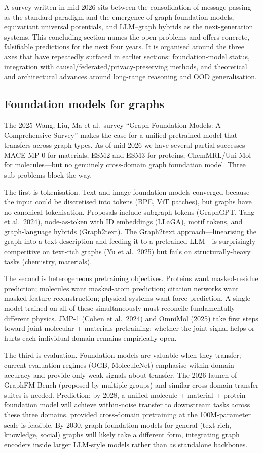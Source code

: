 A survey written in mid-2026 sits between the consolidation of message-passing as the standard paradigm and the emergence of graph foundation models, equivariant universal potentials, and LLM--graph hybrids as the next-generation systems. This concluding section names the open problems and offers concrete, falsifiable predictions for the next four years. It is organised around the three axes that have repeatedly surfaced in earlier sections: foundation-model status, integration with causal/federated/privacy-preserving methods, and theoretical and architectural advances around long-range reasoning and OOD generalisation.

\subsection{Foundation models for graphs}\label{foundation-models-for-graphs}

The 2025 Wang, Liu, Ma et al.~survey ``Graph Foundation Models: A Comprehensive Survey'' makes the case for a unified pretrained model that transfers across graph types. As of mid-2026 we have several partial successes---MACE-MP-0 for materials, ESM2 and ESM3 for proteins, ChemMRL/Uni-Mol for molecules---but no genuinely cross-domain graph foundation model. Three sub-problems block the way.

The first is tokenisation. Text and image foundation models converged because the input could be discretised into tokens (BPE, ViT patches), but graphs have no canonical tokenisation. Proposals include subgraph tokens (GraphGPT, Tang et al.~2024), node-as-token with ID embeddings (LLaGA), motif tokens, and graph-language hybrids (Graph2text). The Graph2text approach---linearising the graph into a text description and feeding it to a pretrained LLM---is surprisingly competitive on text-rich graphs (Yu et al.~2025) but fails on structurally-heavy tasks (chemistry, materials).

The second is heterogeneous pretraining objectives. Proteins want masked-residue prediction; molecules want masked-atom prediction; citation networks want masked-feature reconstruction; physical systems want force prediction. A single model trained on all of these simultaneously must reconcile fundamentally different physics. JMP-1 (Cohen et al.~2024) and OmniMol (2025) take first steps toward joint molecular + materials pretraining; whether the joint signal helps or hurts each individual domain remains empirically open.

The third is evaluation. Foundation models are valuable when they transfer; current evaluation regimes (OGB, MoleculeNet) emphasise within-domain accuracy and provide only weak signals about transfer. The 2026 launch of GraphFM-Bench (proposed by multiple groups) and similar cross-domain transfer suites is needed. Prediction: by 2028, a unified molecule + material + protein foundation model will achieve within-noise transfer to downstream tasks across these three domains, provided cross-domain pretraining at the 100M-parameter scale is feasible. By 2030, graph foundation models for general (text-rich, knowledge, social) graphs will likely take a different form, integrating graph encoders inside larger LLM-style models rather than as standalone backbones.

